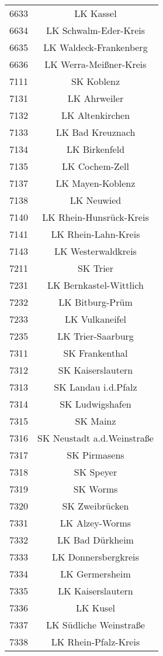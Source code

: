 \begin{tabular}{c c}
    6633&LK Kassel\\ 
    6634&LK Schwalm-Eder-Kreis\\ 
    6635&LK Waldeck-Frankenberg\\ 
    6636&LK Werra-Meißner-Kreis\\ 
    7111&SK Koblenz\\ 
    7131&LK Ahrweiler\\ 
    7132&LK Altenkirchen\\ 
    7133&LK Bad Kreuznach\\ 
    7134&LK Birkenfeld\\ 
    7135&LK Cochem-Zell\\ 
    7137&LK Mayen-Koblenz\\ 
    7138&LK Neuwied\\ 
    7140&LK Rhein-Hunsrück-Kreis\\ 
    7141&LK Rhein-Lahn-Kreis\\ 
    7143&LK Westerwaldkreis\\ 
    7211&SK Trier\\ 
    7231&LK Bernkastel-Wittlich\\ 
    7232&LK Bitburg-Prüm\\ 
    7233&LK Vulkaneifel\\ 
    7235&LK Trier-Saarburg\\ 
    7311&SK Frankenthal\\ 
    7312&SK Kaiserslautern\\ 
    7313&SK Landau i.d.Pfalz\\ 
    7314&SK Ludwigshafen\\ 
    7315&SK Mainz\\ 
    7316&SK Neustadt a.d.Weinstraße\\ 
    7317&SK Pirmasens\\ 
    7318&SK Speyer\\ 
    7319&SK Worms\\ 
    7320&SK Zweibrücken\\ 
    7331&LK Alzey-Worms\\ 
    7332&LK Bad Dürkheim\\ 
    7333&LK Donnersbergkreis\\ 
    7334&LK Germersheim\\ 
    7335&LK Kaiserslautern\\ 
    7336&LK Kusel\\ 
    7337&LK Südliche Weinstraße\\ 
    7338&LK Rhein-Pfalz-Kreis\\ 

\end{tabular}
